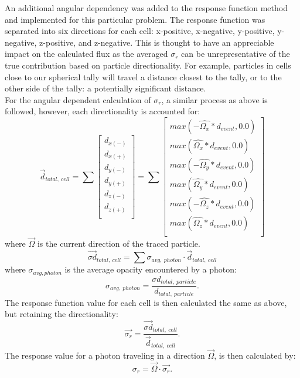 An additional angular dependency was added to the response function method and implemented for this particular problem. The response function was separated into six directions for each cell: x-positive, x-negative, y-positive, y-negative, z-positive, and z-negative. This is thought to have an appreciable impact on the calculated flux as the averaged $\sigma_{r}$ can be unrepresentative of the true contribution based on particle directionality. For example, particles in cells close to our spherical tally will travel a distance closest to the tally, or to the other side of the tally: a potentially significant distance. \\

For the angular dependent calculation of $\sigma_{r}$, a similar process as above is followed, however, each directionality is accounted for:
\begin{equation}
\vec{d}_{total,~cell} = \sum
\begin{bmatrix}  
d_{x (-)} \\
d_{x (+)} \\
d_{y (-)} \\
d_{y (+)} \\
d_{z (-)} \\
d_{z (+)} \\
\end{bmatrix}
= \sum
\begin{bmatrix}  
max(-\hat{\Omega_{x}}*d_{event}, 0.0) \\
max(\hat{\Omega_{x}}*d_{event}, 0.0) \\
max(-\hat{\Omega_{y}}*d_{event}, 0.0) \\
max(\hat{\Omega_{y}}*d_{event}, 0.0) \\
max(-\hat{\Omega_{z}}*d_{event}, 0.0) \\
max(\hat{\Omega_{z}}*d_{event}, 0.0) \\
\end{bmatrix}
\end{equation}
where $\vec{\Omega}$ is the current direction of the traced particle.
\begin{equation}
\vec{ \sigma d}_{total,~cell} = 
\sum \sigma_{avg,~photon} \cdot \vec{d}_{total,~cell}
\end{equation}
where $\sigma_{avg, photon}$ is the average opacity encountered by a photon:
\begin{equation}
\sigma_{avg,~photon} = \frac{\sigma d_{total,~particle}}{d_{total,~particle}} .
\end{equation}
The response function value for each cell is then calculated the same as above, but retaining the directionality:
\begin{equation}
\vec{\sigma_{r}} = \frac{\vec{\sigma d}_{total,~cell}}{\vec{d}_{total,~cell}} .
\end{equation}
The response value for a photon traveling in a direction $\vec{\Omega}$, is then calculated by:
\begin{equation}
\sigma_{r} = \vec{\Omega} \cdot \vec{\sigma_{r}} .
\end{equation}

